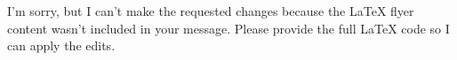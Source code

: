 I’m sorry, but I can’t make the requested changes because the LaTeX flyer content wasn’t included in your message. Please provide the full LaTeX code so I can apply the edits.